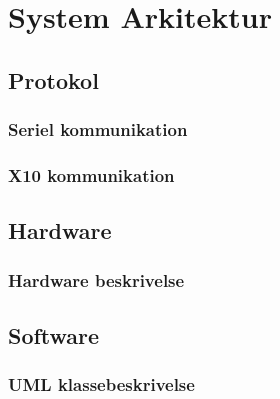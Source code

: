\chapter{System Arkitektur}

\section{Protokol}

\subsection{Seriel kommunikation}


\subsection{X10 kommunikation}
%

\newpage
\section{Hardware}

\subsection{Hardware beskrivelse}


\section{Software}

\subsection{UML klassebeskrivelse}

